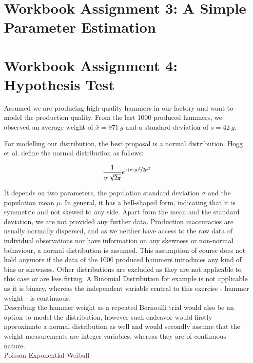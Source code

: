 \chapter{Workbook Assignment 3: A Simple Parameter Estimation}	
\chapter{Workbook Assignment 4: Hypothesis Test}	

Assumed we are producing high-quality hammers in our factory and want to model the production quality. From the last 1000 produced hammers, we observed an average weight of $\bar{x}=971~g$ and a standard deviation of $s=42~g$.

For modelling our distribution, the best proposal is a normal distribution. Hogg et al. \cite[Definition~3.4.1]{hogg} define the normal distribution as follows: 

\begin{equation} 
\frac{1}{{\sigma \sqrt {2\pi } }}e^{{{ - \left( {x - \mu } \right)^2 } \mathord{\left/ {\vphantom {{ - \left( {x - \mu } \right)^2 } {2\sigma ^2 }}} \right. \kern-\nulldelimiterspace} {2\sigma ^2 }}}



\label{eq:normaldist}
\end{equation}

It depends on two parameters, the population standard deviation $\sigma$ and the population mean $\mu$. In general, it has a bell-shaped form, indicating that it is symmetric and not skewed to any side. Apart from the mean and the standard deviation, we are not provided any further data. Production inaccuracies are usually normally dispersed, and as we neither have access to the raw data of individual observations nor have information on any skewness or non-normal behaviour, a normal distribution is assumed. This assumption of course does not hold anymore if the data of the 1000 produced hammers introduces any kind of bias or skewness. 
Other distributions are excluded as they are not applicable to this case or are less fitting. A Binomial Distribution for example is not applicable as it is binary, whereas the independent variable central to this exercise - hammer weight - is continuous. \\Describing the hammer weight as a repeated Bernoulli trial would also be an option to model the distribution, however such endeavor would firstly approximate a normal distribution as well and would secondly assume that the weight measurements are integer variables, whereas they are of continuous nature. \\
Poisson \cite{bruce2017practical}
Exponential
Weibull 



